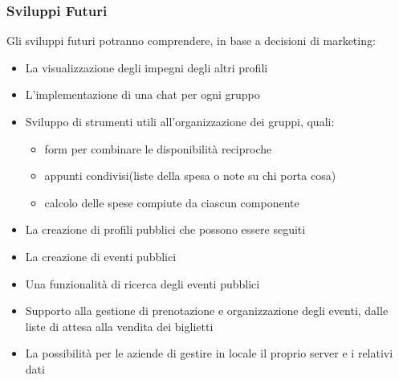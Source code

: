 \subsubsection{Sviluppi Futuri}
Gli sviluppi futuri potranno comprendere, in base a decisioni di marketing:
\begin{itemize}
    \item La visualizzazione degli impegni degli altri profili
    \item L'implementazione di una chat per ogni gruppo
    \item Sviluppo di strumenti utili all'organizzazione dei gruppi, quali:
          \begin{itemize}
              \item form per combinare le disponibilità reciproche
              \item appunti condivisi(liste della spesa o note su chi porta cosa)
              \item calcolo delle spese compiute da ciascun componente
          \end{itemize}
    \item La creazione di profili pubblici che possono essere seguiti
    \item La creazione di eventi pubblici
    \item Una funzionalità di ricerca degli eventi pubblici
    \item Supporto alla gestione di prenotazione e organizzazione degli eventi, dalle liste di attesa alla vendita dei biglietti
    \item La possibilità per le aziende di gestire in locale il proprio server e i relativi dati
\end{itemize}

